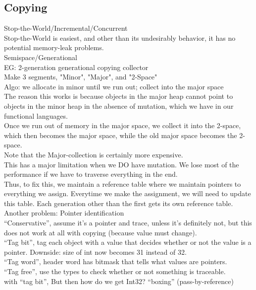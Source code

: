 \subsection{Copying}
Stop-the-World/Incremental/Concurrent \\
Stop-the-World is easiest, and other than its undesirably behavior, it has
no potential memory-leak problems. \\

Semispace/Generational \\
EG: 2-generation generational copying collector \\
Make 3 segments, "Minor", "Major", and "2-Space" \\
Algo: we allocate in minor until we run out; collect into the major space \\
The reason this works is because objects in the major heap cannot point
to objects in the minor heap in the absence of mutation, which we have in
our functional languages. \\
Once we run out of memory in the major space, we collect it into the 2-space,
which then becomes the major space, while the old major space becomes the
2-space. \\
Note that the Major-collection is certainly more expensive. \\

This has a major limitation when we DO have mutation. We lose most of the
performance if we have to traverse everything in the end. \\
Thus, to fix this, we maintain a reference table where we maintain pointers
to everything we assign. Everytime we make the assignment, we will need to
update this table. Each generation other than the first gets its own
reference table. \\

Another problem: Pointer identification \\
``Conservative'', assume it's a pointer and trace, unless it's definitely not,
but this does not work at all with copying (because value must change). \\
``Tag bit'', tag each object with a value that decides whether or not the
value is a pointer. Downside: size of int now becomes 31 instead of 32. \\
``Tag word'', header word has bitmask that tells what values are pointers. \\
``Tag free'', use the types to check whether or not something is traceable. \\

with ``tag bit'', But then how do we get Int32? ``boxing'' (pass-by-reference)
